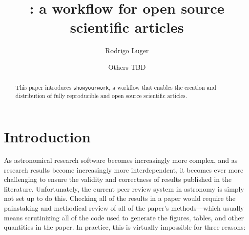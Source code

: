 \documentclass[modern]{aastex631}
\newcommand\syw{\texttt{showyourwork}\xspace}
\begin{document}
\title{\showyourwork: a workflow for open source scientific articles}

\author[0000-0002-0296-3826]{Rodrigo Luger}
\author{Others TBD}

\begin{abstract}
    This paper introduces \syw, a workflow that enables the creation and distribution of fully reproducible and open source scientific articles.
\end{abstract}

\section{Introduction}
\label{sec:intro}
As astronomical research software becomes increasingly more complex, and as research results become increasingly more interdependent, it becomes ever more challenging to ensure the validity and correctness of results published in the literature. 
Unfortunately, the current peer review system in astronomy is simply not set up to do this.
Checking all of the results in a paper would require the painstaking and methodical review of all of the paper's methods---which usually means scrutinizing all of the code used to generate the figures, tables, and other quantities in the paper. 
In practice, this is virtually impossible for three reasons:
\end{document}
